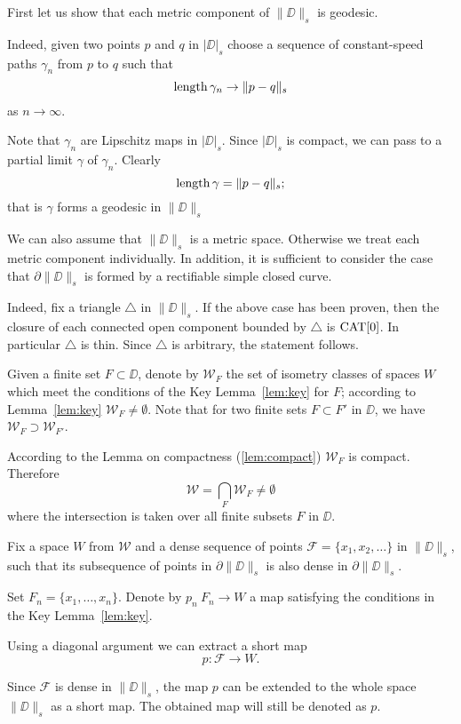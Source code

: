 \documentclass[a4paper,10pt]{amsart}
\begin{document}
First let us show that each metric component of $\|\DD\|_s$ is geodesic.

Indeed, given two points $p$ and $q$ in $|\DD|_s$ 
choose a sequence of constant-speed paths $\gamma_n$ from $p$ to $q$
such that 
\[\mathop{\rm length}\nolimits\gamma_n\to \|p-q\|_s\]
as $n\to\infty$.

Note that $\gamma_n$ are Lipschitz maps in $|\DD|_s$.
Since $|\DD|_s$ is compact, we can pass to a partial limit $\gamma$ of $\gamma_n$.
Clearly \[\mathop{\rm length}\nolimits\gamma= \|p-q\|_s;\]
that is $\gamma$ forms a geodesic in $\|\DD\|_s$

We can also assume that $\|\DD\|_s$ is a metric space. Otherwise we treat each metric component 
individually.
In addition, it is sufficient to consider
the case that $\partial \|\DD\|_s$ is formed by a rectifiable simple closed curve.

Indeed, fix a triangle $\triangle$ in $\|\DD\|_s$. 
If the above case has been proven, 
then the closure of each connected open component bounded by $\triangle$ is $\mathop{\rm CAT}\nolimits[0]$.
In particular $\triangle$ is thin.
Since $\triangle$ is arbitrary, the statement follows.


Given a finite set $F\subset \DD$,
denote by $\mathcal{W}_F$
the set of isometry classes of spaces $W$ which meet the conditions of the Key Lemma~\ref{lem:key}
for $F$;
according to Lemma~\ref{lem:key} $\mathcal{W}_F\ne\emptyset$.
Note that for two finite sets $F\subset F'$ in $\DD$,
we have $\mathcal{W}_F\supset \mathcal{W}_{F'}$.

According to the Lemma on compactness (\ref{lem:compact}) $\mathcal{W}_F$ is compact.
Therefore 
\[\mathcal{W}
=
\bigcap_{F}\mathcal{W}_F\ne \emptyset\]
where the intersection is taken over all finite subsets $F$ in $\DD$. 

Fix a space $W$ from $\mathcal{W}$
and a dense sequence of points $\mathcal{F}=\{x_1,x_2,\dots\}$ in $\|\DD\|_s$, 
such that its subsequence of points in $\partial \|\DD\|_s$ is
 also dense in $\partial \|\DD\|_s$.

Set $F_n=\{x_1,\dots,x_n\}$.
Denote by $p_n\:F_n\to W$ a map satisfying the conditions in the Key Lemma~\ref{lem:key}.

Using a diagonal argument we can extract a short map \[p:\mathcal{F}\to W.\]

Since $\mathcal{F}$ is dense in $\|\DD\|_s$,
the map $p$ can be extended to the whole space $\|\DD\|_s$ 
as a short map.
The obtained map will still be denoted as $p$.
\end{document}
